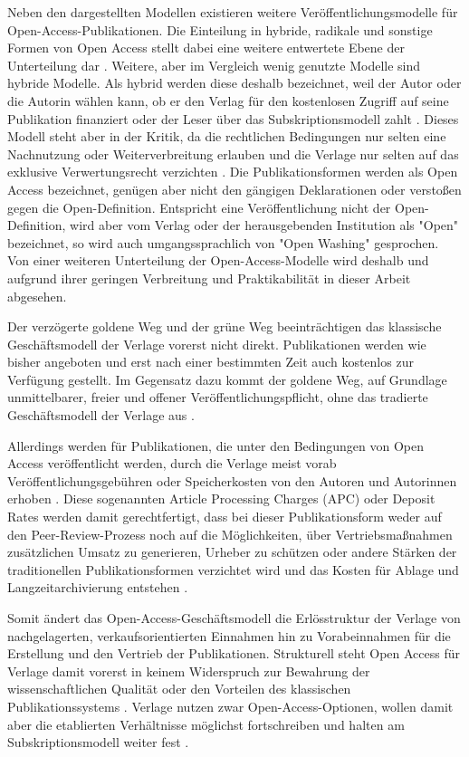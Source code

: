 Neben den dargestellten Modellen existieren weitere Veröffentlichungsmodelle für Open-Access-Publikationen. Die Einteilung in hybride, radikale und sonstige Formen von Open Access stellt dabei eine weitere entwertete Ebene der Unterteilung dar \cite{Mounce_2015}. Weitere, aber im Vergleich wenig genutzte Modelle sind hybride Modelle. Als hybrid werden diese deshalb bezeichnet, weil der Autor oder die Autorin wählen kann, ob er den Verlag für den kostenlosen Zugriff auf seine Publikation finanziert oder der Leser über das Subskriptionsmodell zahlt \cite{Mueller_2010}. Dieses Modell steht aber in der Kritik, da die rechtlichen Bedingungen nur selten eine Nachnutzung oder Weiterverbreitung erlauben und die Verlage nur selten auf das exklusive Verwertungsrecht verzichten \cite{Mueller_2010}. Die Publikationsformen werden als Open Access bezeichnet, genügen aber nicht den gängigen Deklarationen \cite{BOAI_2012} oder verstoßen gegen die Open-Definition. Entspricht eine Veröffentlichung nicht der Open-Definition, wird aber vom Verlag oder der herausgebenden Institution als "Open" bezeichnet, so wird auch umgangssprachlich von "Open Washing" gesprochen. Von einer weiteren Unterteilung der Open-Access-Modelle wird deshalb und aufgrund ihrer geringen Verbreitung und Praktikabilität in dieser Arbeit abgesehen.

Der verzögerte goldene Weg und der grüne Weg beeinträchtigen das klassische Geschäftsmodell der Verlage vorerst nicht direkt. Publikationen werden wie bisher angeboten und erst nach einer bestimmten Zeit auch kostenlos zur Verfügung gestellt. Im Gegensatz dazu kommt der goldene Weg, auf Grundlage unmittelbarer, freier und offener Veröffentlichungspflicht, ohne das tradierte Geschäftsmodell der Verlage aus \cite{Lewis_2012}.

Allerdings werden für Publikationen, die unter den Bedingungen von Open Access veröffentlicht werden, durch die Verlage meist vorab Veröffentlichungsgebühren oder Speicherkosten von den Autoren und Autorinnen erhoben \cite{Jubb_2011}. Diese sogenannten Article Processing Charges (APC) oder Deposit Rates werden damit gerechtfertigt, dass bei dieser Publikationsform weder auf den Peer-Review-Prozess noch auf die Möglichkeiten, über Vertriebsmaßnahmen zusätzlichen Umsatz zu generieren, Urheber zu schützen oder andere Stärken der traditionellen Publikationsformen verzichtet wird \cite{Albert_2006} \cite{Bargheer_2009} und das Kosten für Ablage und Langzeitarchivierung entstehen \cite{Jubb_2011}.

Somit ändert das Open-Access-Geschäftsmodell die Erlösstruktur der Verlage von nachgelagerten, verkaufsorientierten Einnahmen hin zu Vorabeinnahmen für die Erstellung und den Vertrieb der Publikationen. Strukturell steht Open Access für Verlage damit vorerst in keinem Widerspruch zur Bewahrung der wissenschaftlichen Qualität oder den Vorteilen des klassischen Publikationssystems \cite{Suber_2002}. Verlage nutzen zwar Open-Access-Optionen, wollen damit aber die etablierten Verhältnisse möglichst fortschreiben und halten am Subskriptionsmodell weiter fest \cite{Schmidt_2007}.

